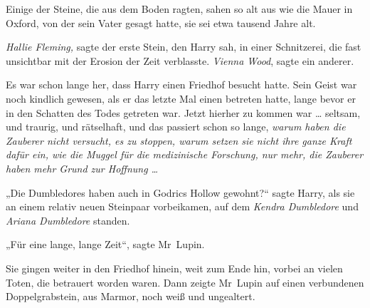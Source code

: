 Einige der Steine, die aus dem Boden ragten, sahen so alt aus wie die Mauer in Oxford, von der sein Vater gesagt hatte, sie sei etwa tausend Jahre alt.

\emph{Hallie Fleming,} sagte der erste Stein, den Harry sah, in einer Schnitzerei, die fast unsichtbar mit der Erosion der Zeit verblasste. \emph{Vienna Wood}, sagte ein anderer.

Es war schon lange her, dass Harry einen Friedhof besucht hatte. Sein Geist war noch kindlich gewesen, als er das letzte Mal einen betreten hatte, lange bevor er in den Schatten des Todes getreten war. Jetzt hierher zu kommen war … seltsam, und traurig, und rätselhaft, und das passiert schon so lange, \emph{warum haben die Zauberer nicht versucht, es zu stoppen, warum setzen sie nicht ihre ganze Kraft dafür ein, wie die Muggel für die medizinische Forschung, nur mehr, die Zauberer haben mehr Grund zur Hoffnung …}

„Die Dumbledores haben auch in Godrics Hollow gewohnt?“ sagte Harry, als sie an einem relativ neuen Steinpaar vorbeikamen, auf dem \emph{Kendra Dumbledore} und \emph{Ariana Dumbledore} standen.

„Für eine lange, lange Zeit“, sagte Mr~Lupin.


Sie gingen weiter in den Friedhof hinein, weit zum Ende hin, vorbei an vielen Toten, die betrauert worden waren. Dann zeigte Mr~Lupin auf einen verbundenen Doppelgrabstein, aus Marmor, noch weiß und ungealtert.

